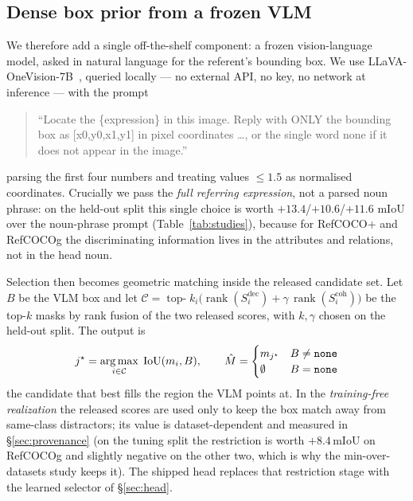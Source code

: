 \subsection{Dense box prior from a frozen VLM}
\label{sec:boxprior}
We therefore add a single off-the-shelf component: a frozen vision-language
model, asked in natural language for the referent's bounding box. We use
LLaVA-OneVision-7B~\cite{li2024llavaov}, queried locally --- no external API, no
key, no network at inference --- with the prompt
\begin{quote}\small
``Locate the \{expression\} in this image. Reply with ONLY the bounding box
as [x0,y0,x1,y1] in pixel coordinates \dots, or the single word none if it
does not appear in the image.''
\end{quote}
parsing the first four numbers and treating values $\le 1.5$ as normalised
coordinates. Crucially we pass the \emph{full referring expression}, not a
parsed noun phrase: on the held-out split this single choice is worth
$+13.4$/$+10.6$/$+11.6$ mIoU over the noun-phrase prompt
(Table~\ref{tab:studies}), because for RefCOCO+ and RefCOCOg the
discriminating information lives in the attributes and relations, not in the
head noun.

Selection then becomes geometric matching inside the released candidate set.
Let $B$ be the VLM box and let
$\mathcal{C}=\operatorname{top-}k_i\big(\operatorname{rank}(S^{\mathrm{dec}}_i)
+ \gamma\,\operatorname{rank}(S^{\mathrm{coh}}_i)\big)$ be the top-$k$ masks
by rank fusion of the two released scores, with $k,\gamma$ chosen on the
held-out split. The output is
\begin{equation}
\label{eq:select}
j^\star = \operatorname*{arg\,max}_{i \in \mathcal{C}} \; \mathrm{IoU}(m_i, B),
\qquad
\hat{M} = \begin{cases} m_{j^\star} & B \neq \texttt{none}\\ \emptyset & B = \texttt{none}\end{cases}
\end{equation}
the candidate that best fills the region the VLM points at. In the
\emph{training-free realization} the released scores are used only to keep the
box match away from same-class distractors; its value is dataset-dependent and
measured in \S\ref{sec:provenance} (on the tuning split the restriction is
worth $+8.4$\,mIoU on RefCOCOg and slightly negative on the other two, which
is why the min-over-datasets study keeps it). The shipped head replaces that
restriction stage with the learned selector of \S\ref{sec:head}.

